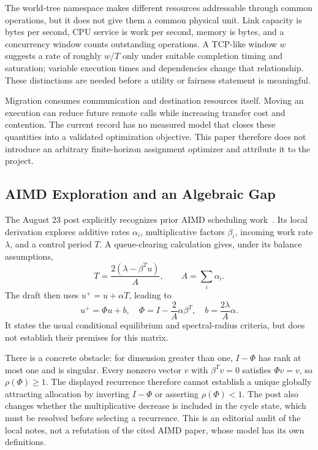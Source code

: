\documentclass[conference,letterpaper]{IEEEtran}
\begin{document}
The world-tree namespace makes different resources addressable through common operations, but it does not give them a common physical unit. Link capacity is bytes per second, CPU service is work per second, memory is bytes, and a concurrency window counts outstanding operations. A TCP-like window $w$ suggests a rate of roughly $w/T$ only under suitable completion timing and saturation; variable execution times and dependencies change that relationship. These distinctions are needed before a utility or fairness statement is meaningful.

Migration consumes communication and destination resources itself. Moving an execution can reduce future remote calls while increasing transfer cost and contention. The current record has no measured model that closes these quantities into a validated optimization objective. This paper therefore does not introduce an arbitrary finite-horizon assignment optimizer and attribute it to the project.

\subsection{AIMD Exploration and an Algebraic Gap}
The August 23 post explicitly recognizes prior AIMD scheduling work~\cite{aimd}. Its local derivation explores additive rates $\alpha_i$, multiplicative factors $\beta_i$, incoming work rate $\lambda$, and a control period $T$. A queue-clearing calculation gives, under its balance assumptions,
\begin{equation}
T=\frac{2(\lambda-\beta^Tu)}{A},\qquad A=\sum_i\alpha_i.
\end{equation}
The draft then uses $u^+=u+\alpha T$, leading to
\begin{equation}
u^+=\Phi u+b,\quad
\Phi=I-\frac2A\alpha\beta^T,\quad b=\frac{2\lambda}A\alpha.
\label{eq:historical}
\end{equation}
It states the usual conditional equilibrium and spectral-radius criteria, but does not establish their premises for this matrix.

There is a concrete obstacle: for dimension greater than one, $I-\Phi$ has rank at most one and is singular. Every nonzero vector $v$ with $\beta^Tv=0$ satisfies $\Phi v=v$, so $\rho(\Phi)\ge1$. The displayed recurrence therefore cannot establish a unique globally attracting allocation by inverting $I-\Phi$ or asserting $\rho(\Phi)<1$. The post also changes whether the multiplicative decrease is included in the cycle state, which must be resolved before selecting a recurrence. This is an editorial audit of the local notes, not a refutation of the cited AIMD paper, whose model has its own definitions.
\end{document}
